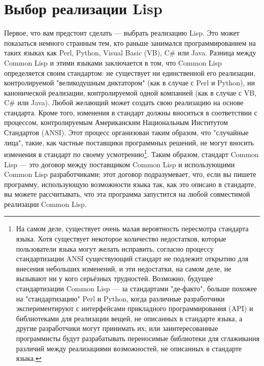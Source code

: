 \section{Выбор реализации Lisp}

Первое, что вам предстоит сделать --- выбрать реализацию Lisp. Это может показаться
немного странным тем, кто раньше занимался программированием на таких языках как Perl,
Python, Visual Basic (VB), C\# или Java. Разница между Common Lisp и этими языками
заключается в том, что Common Lisp определяется своим стандартом: не существует ни
единственной его реализации, контролируемой "великодушным диктатором" (как в случае с Perl
и Python), ни канонической реализации, контролируемой одной компанией (как в случае с VB,
C\# или Java). Любой желающий может создать свою реализацию на основе стандарта. Кроме
того, изменения в стандарт должны вноситься в соответствии с процессом, контролируемым
Американским Национальным Институтом Стандартов (ANSI). Этот процесс организован таким
образом, что "случайные лица", такие, как частные поставщики программных решений, не могут
вносить изменения в стандарт по своему усмотрению\footnote{На самом деле, существует очень
  малая вероятность пересмотра стандарта языка. Хотя существует некоторое количество
  недостатков, которые пользователи языка могут желать исправить, согласно процессу
  стандартизации ANSI существующий стандарт не подлежит открытию для внесения небольших
  изменений, и эти недостатки, на самом деле, не вызывают ни у кого серьёзных
  трудностей. Возможно, будущее стандартизации Common Lisp --- за стандартами "де-факто",
  больше похожее на "стандартизацию" Perl и Python, когда различные разработчики
  экспериментируют с интерфейсами прикладного программирования (API) и библиотеками для
  реализации вещей, не описанных в стандарте языка, а другие разработчики могут принимать
  их; или заинтересованные программисты будут разрабатывать переносимые библиотеки для
  сглаживания различий между реализациями возможностей, не описанных в стандарте
  языка.}. Таким образом, стандарт Common Lisp --- это договор между поставщиком Common
Lisp и использующими Common Lisp разработчиками; этот договор подразумевает, что, если вы
пишете программу, использующую возможности языка так, как это описано в стандарте, вы
можете рассчитывать, что эта программа запустится на любой совместимой реализации Common
Lisp.

